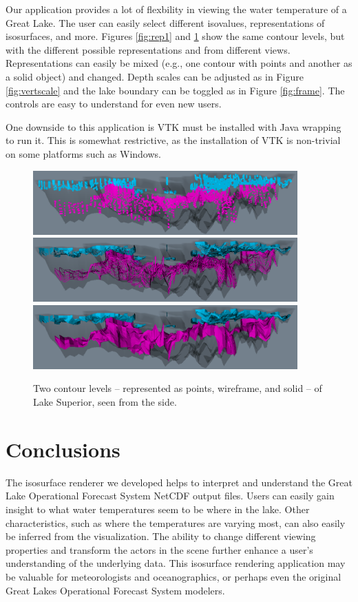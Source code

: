 \documentclass{article} %
\begin{document}
Our application provides a lot of flexbility in viewing the water temperature of a Great Lake.  The user can easily select different isovalues, representations of isosurfaces, and more.  Figures \ref{fig:rep1} and \ref{fig:rep2} show the same contour levels, but with the different possible representations and from different views.  Representations can easily be mixed (e.g., one contour with points and another as a solid object) and changed.  Depth scales can be adjusted as in Figure \ref{fig:vertscale} and the lake boundary can be toggled as in Figure \ref{fig:frame}.  The controls are easy to understand for even new users.  

One downside to this application is VTK must be installed with Java wrapping to run it.  This is somewhat restrictive, as the installation of VTK is non-trivial on some platforms such as Windows.

\begin{figure}[htb]
   \centering
   \includegraphics[width=4in]{figures/points2.eps}
   \includegraphics[width=4in]{figures/wireframe2.eps}
   \includegraphics[width=4in]{figures/surface2.eps}
    \caption{Two contour levels -- represented as points, wireframe, and solid -- of Lake Superior, seen from the side.}
   \label{fig:rep2}
\end{figure}

\section{Conclusions}

The isosurface renderer we developed helps to interpret and understand the Great Lake Operational Forecast System NetCDF output files.  Users can easily gain insight to what water  temperatures seem to be where in the lake.  Other characteristics, such as where the temperatures are varying most, can also easily be inferred from the visualization.  The ability to change different viewing properties and transform the actors in the scene further enhance a user's understanding of the underlying data. This isosurface rendering application may be valuable for meteorologists and oceanographics, or perhaps even the original Great Lakes Operational Forecast System modelers.
\end{document}

